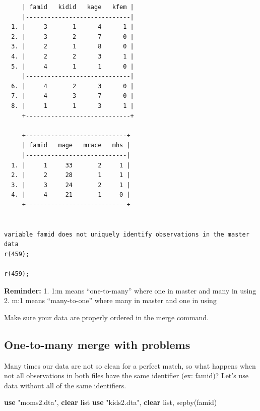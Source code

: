 \documentclass[
]{book}
\newenvironment{Shaded}{\begin{snugshade}}{\end{snugshade}}
\newcommand{\KeywordTok}[1]{\textcolor[rgb]{0.13,0.29,0.53}{\textbf{#1}}}
\newcommand{\NormalTok}[1]{#1}
\newcommand{\OtherTok}[1]{\textcolor[rgb]{0.56,0.35,0.01}{#1}}
\newcommand{\StringTok}[1]{\textcolor[rgb]{0.31,0.60,0.02}{#1}}
\begin{document}
\begin{verbatim}
     | famid   kidid   kage   kfem |
     |-----------------------------|
  1. |     3       1      4      1 |
  2. |     3       2      7      0 |
  3. |     2       1      8      0 |
  4. |     2       2      3      1 |
  5. |     4       1      1      0 |
     |-----------------------------|
  6. |     4       2      3      0 |
  7. |     4       3      7      0 |
  8. |     1       1      3      1 |
     +-----------------------------+

     +----------------------------+
     | famid   mage   mrace   mhs |
     |----------------------------|
  1. |     1     33       2     1 |
  2. |     2     28       1     1 |
  3. |     3     24       2     1 |
  4. |     4     21       1     0 |
     +----------------------------+


variable famid does not uniquely identify observations in the master data
r(459);

r(459);
\end{verbatim}

\textbf{Reminder:}
1. 1:m means ``one-to-many'' where one in master and many in using
2. m:1 means ``many-to-one'' where many in master and one in using

Make sure your data are properly ordered in the merge command.

\subsection{One-to-many merge with problems}\label{one-to-many-merge-with-problems}

Many times our data are not so clean for a perfect match, so what happens
when not all observations in both files have the same identifier (ex: famid)?
Let's use data without all of the same identifiers.

\begin{Shaded}
\begin{Highlighting}[]
\KeywordTok{use} \StringTok{"moms2.dta"}\NormalTok{, }\KeywordTok{clear}
\OtherTok{list}
\KeywordTok{use} \StringTok{"kids2.dta"}\NormalTok{, }\KeywordTok{clear}
\OtherTok{list}\NormalTok{, sepby(famid)}
\end{Highlighting}
\end{Shaded}
\end{document}
